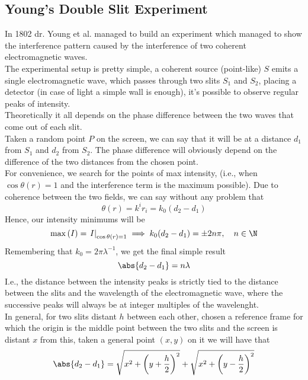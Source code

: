 \documentclass[../electromagnetism.tex]{subfiles}
\begin{document}
\subsection{Young's Double Slit Experiment}
In 1802 dr. Young et al. managed to build an experiment which managed to show the interference pattern caused by the interference of two coherent electromagnetic waves.\\
The experimental setup is pretty simple, a coherent source (point-like) $S$ emits a single electromagnetic wave, which passes through two slits $S_1$ and $S_2$, placing a detector (in case of light a simple wall is enough), it's possible to observe regular peaks of intensity.\\
Theoretically it all depends on the phase difference between the two waves that come out of each slit.\\
Taken a random point $P$ on the screen, we can say that it will be at a distance $d_1$ from $S_1$ and $d_2$ from $S_2$. The phase difference will obviously depend on the difference of the two distances from the chosen point.\\
For convenience, we search for the points of max intensity, (i.e., when $\cos\theta(r)=1$ and the interference term is the maximum possible). Due to coherence between the two fields, we can say without any problem that
\begin{equation*}
	\theta(r)=k^ir_i=k_0(d_2-d_1)
\end{equation*}
Hence, our intensity minimums will be 
\begin{equation*}
	\max\left( I \right)=\left. I\right|_{\cos\theta(r)=1}\implies k_0(d_2-d_1)=\pm2n\pi,\quad n\in\N
\end{equation*}
Remembering that $k_0=2\pi\lambda^{-1}$, we get the final simple result
\begin{equation}
	\abs{d_2-d_1}=n\lambda
	\label{eq:interfdist}
\end{equation}
I.e., the distance between the intensity peaks is strictly tied to the distance between the slits and the wavelength of the electromagnetic wave, where the successive peaks will always be at integer multiples of the wavelenght.\\
In general, for two slits distant $h$ between each other, chosen a reference frame for which the origin is the middle point between the two slits and the screen is distant $x$ from this, taken a general point $(x,y)$ on it we will have that
\begin{equation*}
	\abs{d_2-d_1}=\sqrt{x^2+\left( y+\frac{h}{2} \right)^2}+\sqrt{x^2+\left( y-\frac{h}{2} \right)^2}
\end{equation*}
\end{document}
